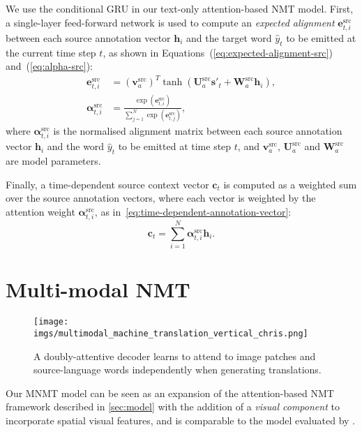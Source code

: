 \documentclass[11pt]{article}
\begin{document}
We use the conditional GRU in our text-only attention-based NMT model.
First, a single-layer feed-forward network is used to compute an \emph{expected alignment} $\bm{e}^\text{src}_{t,i}$ between each source annotation vector $\bm{h}_i$ and the target word $\hat{y}_t$ to be emitted at the current time step $t$, as shown in Equations~(\ref{eq:expected-alignment-src}) and~(\ref{eq:alpha-src}):
\begin{align}
\bm{e}^\text{src}_{t,i} &= (\bm{v}^\text{src}_a)^T \tanh( \bm{U}^\text{src}_a \bm{s}'_t + \bm{W}^\text{src}_a \bm{h}_i),\label{eq:expected-alignment-src}\\
\bm{\alpha}^\text{src}_{t,i} &= \frac{\exp{(\bm{e}^\text{src}_{t,i})}}{ \sum_{j=1}^{N}{\exp{(\bm{e}^\text{src}_{t,j})}} },\label{eq:alpha-src}
\end{align}
\noindent
where $\bm{\alpha}^\text{src}_{t,i}$ is the normalised alignment matrix between each source annotation vector $\bm{h}_i$ and the word $\hat{y}_t$ to be emitted at time step $t$, and $\bm{v}^\text{src}_a$, $\bm{U}^\text{src}_a$ and $\bm{W}^\text{src}_a$ are model parameters.

Finally, a time-dependent source context vector $\bm{c}_t$ is computed as a weighted sum over the source annotation vectors, where each vector is weighted by the attention weight $\bm{\alpha}^\text{src}_{t,i}$, as in~\cref{eq:time-dependent-annotation-vector}:
\begin{equation}
\label{eq:time-dependent-annotation-vector}
    \bm{c}_t = \text{$\sum_{i=1}^{N}{ \bm{\alpha}^\text{src}_{t,i} \bm{h}_i }$}.
\end{equation}



\section{Multi-modal NMT}
\label{sec:multimodal-model}

\begin{figure}[t!]
 \centering
 \texttt{[image: imgs/multimodal\_machine\_translation\_vertical\_chris.png]}
\caption{
 A doubly-attentive decoder learns to attend to image patches and source-language words independently when generating translations.
 }
 \label{fig:separate-doubly-attentive}
\end{figure}

Our MNMT model can be seen as an expansion of the attention-based NMT framework described in \cref{sec:model} with the addition of a \emph{visual component} to incorporate spatial visual features, and is comparable to the model evaluated by .
\end{document}
